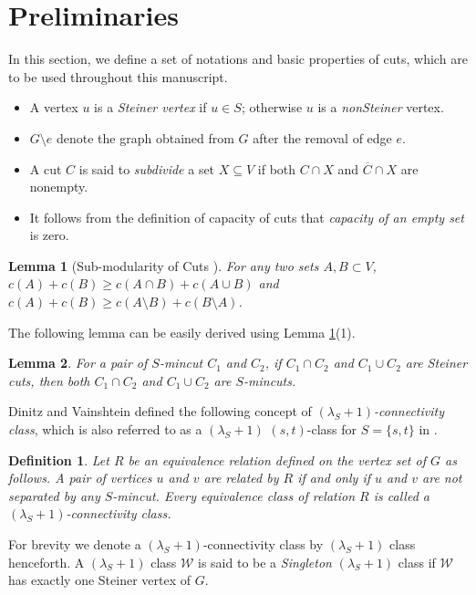 \documentclass[letterpaper,11pt]{article}
\newtheorem{definition}{Definition}[]
\newtheorem{lemma}{Lemma}[]
\begin{document}
\section{Preliminaries} \label{sec : Preliminaries}
In this section, we define a set of notations and basic properties of cuts, which are to be used throughout this manuscript.
\begin{itemize}
\item  A vertex $u$ is a \textit{Steiner vertex} if $u\in S$; otherwise $u$ is a \textit{nonSteiner} vertex.
    \item $G\setminus e$ denote the graph obtained from $G$ after the removal of edge $e$.
    \item A cut $C$ is said to \textit{subdivide} a set $X\subseteq V$ if both $C\cap X$ and $\overline{C}\cap X$ are nonempty.
\item It follows from the definition of capacity of cuts that \textit{capacity of an empty set} is zero.
\end{itemize}









\begin{lemma}[Sub-modularity of Cuts \cite{DBLP:journals/dam/NagamochiI00}] \label{submodularity of cuts}
    For any two sets $A,B\subset V$,\\
      $c(A)+c(B)\ge c(A\cap B)+c(A\cup B)$ and  $c(A)+c(B)\ge c(A\setminus B)+c(B\setminus A)$.
\end{lemma}
The following lemma can be easily derived using Lemma \ref{submodularity of cuts}(1).
\begin{lemma} \label{lem : mincuts closed under int and uni}
    For a pair of $S$-mincut $C_1$ and $C_2$, if $C_1\cap C_2$ and $C_1\cup C_2$ are Steiner cuts, then both $C_1\cap C_2$ and $C_1\cup C_2$ are $S$-mincuts. 
\end{lemma}
Dinitz and Vainshtein \cite{DBLP:conf/stoc/DinitzV94, DBLP:conf/soda/DinitzV95, DBLP:journals/siamcomp/DinitzV00} defined the following concept of \textit{$(\lambda_S+1)$-connectivity class}, which is also referred to as a $(\lambda_S+1)$ $(s,t)$-class for $S=\{s,t\}$ in \cite{DBLP:journals/talg/BaswanaBP23}. 
\begin{definition} \label{def : lambda+1 S-class}
    Let $R$ be an equivalence relation defined on the vertex set of $G$ as follows. A pair of vertices $u$ and $v$ are related by $R$ if and only if $u$ and $v$ are not separated by any $S$-mincut. Every equivalence class of relation $R$ is called a $(\lambda_S+1)$-connectivity class.
\end{definition}
For brevity we denote a $(\lambda_S+1)$-connectivity class by $(\lambda_S+1)$ class henceforth. A $(\lambda_S+1)$ class ${\mathcal W}$ is said to be a \textit{Singleton} $(\lambda_S+1)$ class if ${\mathcal W}$ has exactly one Steiner vertex of $G$. 
\end{document}
